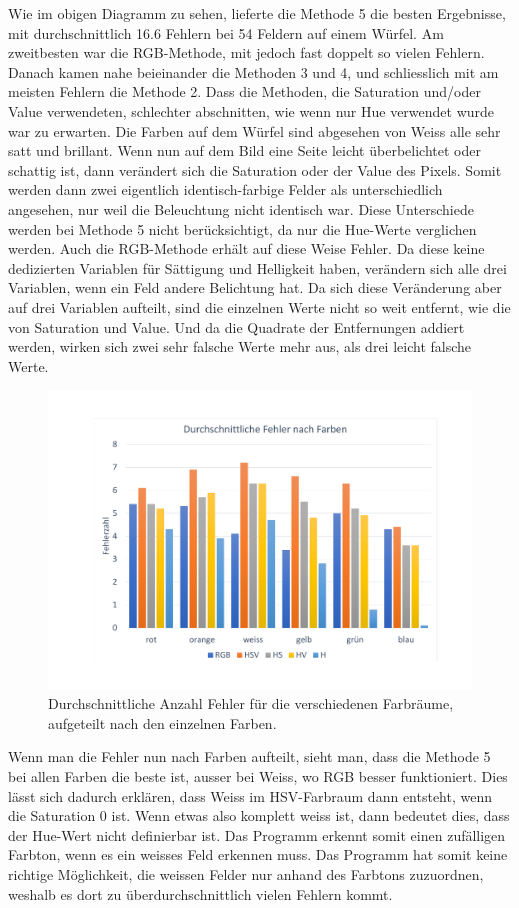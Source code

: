 \documentclass[a4paper, 12pt]{article}
\begin{document}
Wie im obigen Diagramm zu sehen, lieferte die Methode 5 die besten Ergebnisse, mit durchschnittlich 16.6 Fehlern bei 54 Feldern auf einem Würfel. Am zweitbesten war die RGB-Methode, mit jedoch fast doppelt so vielen Fehlern. Danach kamen nahe beieinander die Methoden 3 und 4, und schliesslich mit am meisten Fehlern die Methode 2. Dass die Methoden, die Saturation und/oder Value verwendeten, schlechter abschnitten, wie wenn nur Hue verwendet wurde war zu erwarten. Die Farben auf dem Würfel sind abgesehen von Weiss alle sehr satt und brillant. Wenn nun auf dem Bild eine Seite leicht überbelichtet oder schattig ist, dann verändert sich die Saturation oder der Value des Pixels. Somit werden dann zwei eigentlich identisch-farbige Felder als unterschiedlich angesehen, nur weil die Beleuchtung nicht identisch war. Diese Unterschiede werden bei Methode 5 nicht berücksichtigt, da nur die Hue-Werte verglichen werden. Auch die RGB-Methode erhält auf diese Weise Fehler. Da diese keine dedizierten Variablen für Sättigung und Helligkeit haben, verändern sich alle drei Variablen, wenn ein Feld andere Belichtung hat. Da sich diese Veränderung aber auf drei Variablen aufteilt, sind die einzelnen Werte nicht so weit entfernt, wie die von Saturation und Value. Und da die Quadrate der Entfernungen addiert werden, wirken sich zwei sehr falsche Werte mehr aus, als drei leicht falsche Werte. 
\begin{figure}[H]
\includegraphics[scale=0.4]{durchschnittliche_Fehler_nach_Farben}
\caption{Durchschnittliche Anzahl Fehler für die verschiedenen Farbräume, aufgeteilt nach den einzelnen Farben.}
\end{figure}
Wenn man die Fehler nun nach Farben aufteilt, sieht man, dass die Methode 5 bei allen Farben die beste ist, ausser bei Weiss, wo RGB besser funktioniert. Dies lässt sich dadurch erklären, dass Weiss im HSV-Farbraum dann entsteht, wenn die Saturation 0 ist. Wenn etwas also komplett weiss ist, dann bedeutet dies, dass der Hue-Wert nicht definierbar ist. Das Programm erkennt somit einen zufälligen Farbton, wenn es ein weisses Feld erkennen muss. Das Programm hat somit keine richtige Möglichkeit, die weissen Felder nur anhand des Farbtons zuzuordnen, weshalb es dort zu überdurchschnittlich vielen Fehlern kommt. 
\end{document}
